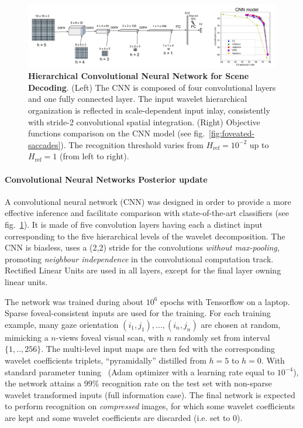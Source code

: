 \documentclass[12pt,twoside,openright]{article}
\begin{document}
\begin{figure}
	\centerline{
		\includegraphics[width = \linewidth]{img/frontiers-convolutional.pdf} 
	}
	\vspace{-.2cm}
	\caption{\textbf{Hierarchical Convolutional Neural Network for Scene Decoding}. (Left) The CNN is composed of four convolutional layers and one fully connected layer. The input wavelet hierarchical organization is reflected in scale-dependent input inlay, consistently with stride-2 convolutional spatial integration. (Right) Objective functions comparison on the CNN model (see  fig.~\ref{fig:foveated-saccades}). The recognition threshold varies from $H_\text{ref}=10^{-2}$ up to  $H_\text{ref}=1$ (from left to right).}\label{fig:CNN}
\end{figure}

\paragraph{Convolutional Neural Networks Posterior update}
A convolutional neural network (CNN) was designed in order to provide a more effective {\color{Purple} inference} and facilitate comparison with state-of-the-art classifiers (see fig.~\ref{fig:CNN}). 
It is made of five convolution layers having each a distinct input corresponding to the five hierarchical levels of the wavelet decomposition. 
The CNN is biasless, uses a (2,2) stride for the convolutions \emph{without max-pooling}, promoting \emph{neighbour independence} in the convolutional computation track.
Rectified Linear Units are used in all layers, except for the final layer owning linear units. 

The network was trained during about $10^6$ epochs with Tensorflow on a laptop.
{\color{Purple} Sparse foveal-consistent inputs are used for the training. For each training example, many gaze orientation $(i_1,j_1), ..., (i_n,j_n)$ are chosen at random, mimicking a $n$-views foveal visual scan, with $n$ randomly set from interval $\{1,..,256\}$. The multi-level input maps are then fed with the corresponding wavelet coefficients triplets, “pyramidally” distilled from $h = 5$ to $h = 0$.}  With standard parameter tuning { \color{Purple}(Adam optimizer \citep{kingma2014adam} with a learning rate equal to $10^{-4}$)}, the network attains a 99\% recognition rate on the test set with non-{\color{Purple}sparse} wavelet transformed inputs {\color{Purple}(full information case)}. 
{\color{Purple} The final network is expected to perform recognition on \emph{compressed} images, for which some wavelet coefficients are kept and some wavelet coefficients are discarded (i.e. set to 0).}
\end{document}
